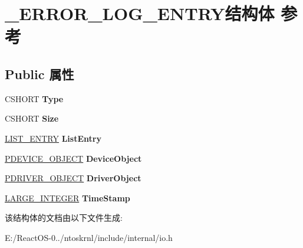 \hypertarget{struct___e_r_r_o_r___l_o_g___e_n_t_r_y}{}\section{\+\_\+\+E\+R\+R\+O\+R\+\_\+\+L\+O\+G\+\_\+\+E\+N\+T\+R\+Y结构体 参考}
\label{struct___e_r_r_o_r___l_o_g___e_n_t_r_y}
\subsection*{Public 属性}
\begin{DoxyCompactItemize}
\item 
\mbox{\label{struct___e_r_r_o_r___l_o_g___e_n_t_r_y_a6e33fe902170f7b64e9cd83d6fd97d7e}} 
C\+S\+H\+O\+RT {\bfseries Type}
\item 
\mbox{\label{struct___e_r_r_o_r___l_o_g___e_n_t_r_y_a2e845cfdfc01d6fec90ff002759ab0bb}} 
C\+S\+H\+O\+RT {\bfseries Size}
\item 
\mbox{\label{struct___e_r_r_o_r___l_o_g___e_n_t_r_y_ad11a87c3df5a3effe4fb7c1af4608ed3}} 
\hyperlink{struct___l_i_s_t___e_n_t_r_y}{L\+I\+S\+T\+\_\+\+E\+N\+T\+RY} {\bfseries List\+Entry}
\item 
\mbox{\label{struct___e_r_r_o_r___l_o_g___e_n_t_r_y_ae8bbb580f30d06bcaa6c16c3359a8315}} 
\hyperlink{struct___d_e_v_i_c_e___o_b_j_e_c_t}{P\+D\+E\+V\+I\+C\+E\+\_\+\+O\+B\+J\+E\+CT} {\bfseries Device\+Object}
\item 
\mbox{\label{struct___e_r_r_o_r___l_o_g___e_n_t_r_y_af7fb3e5676d8946c0b4454a60fa08212}} 
\hyperlink{struct___d_r_i_v_e_r___o_b_j_e_c_t}{P\+D\+R\+I\+V\+E\+R\+\_\+\+O\+B\+J\+E\+CT} {\bfseries Driver\+Object}
\item 
\mbox{\label{struct___e_r_r_o_r___l_o_g___e_n_t_r_y_a130e591bc1a5618b6c6e5974ae30c43a}} 
\hyperlink{union___l_a_r_g_e___i_n_t_e_g_e_r}{L\+A\+R\+G\+E\+\_\+\+I\+N\+T\+E\+G\+ER} {\bfseries Time\+Stamp}
\end{DoxyCompactItemize}


该结构体的文档由以下文件生成\+:\begin{DoxyCompactItemize}
\item 
E\+:/\+React\+O\+S-\/0../ntoskrnl/include/internal/io.\+h\end{DoxyCompactItemize}
